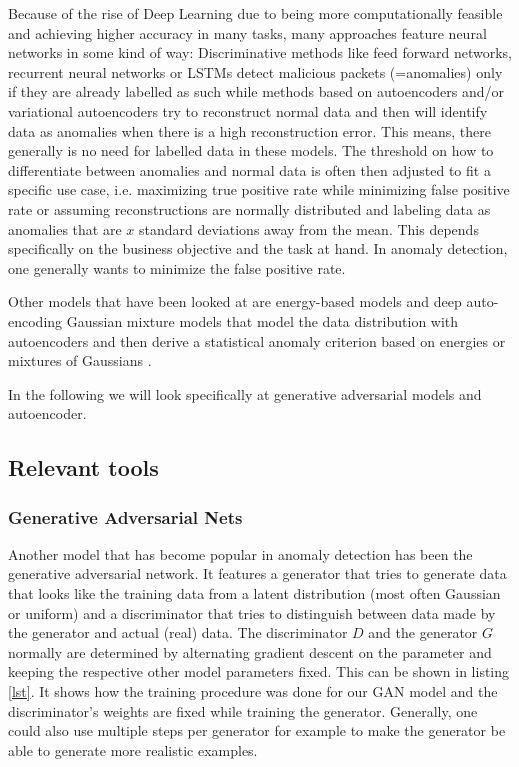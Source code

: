 \documentclass[]{article}
\begin{document}
	 \noindent
	 Because of the rise of Deep Learning due to being more computationally feasible and achieving higher accuracy in many tasks, many approaches feature neural networks in some kind of way: Discriminative methods like feed forward networks, recurrent neural networks or LSTMs detect malicious packets (=anomalies) only if they are already labelled as such while methods based on autoencoders and/or variational autoencoders try to reconstruct normal data and then will identify data as anomalies when there is a high reconstruction error. This means, there generally is no need for labelled data in these models. The threshold on how to differentiate between anomalies and normal data is often then adjusted to fit a specific use case, i.e. maximizing true positive rate while minimizing false positive rate or assuming reconstructions are normally distributed and labeling data as anomalies that are $x$ standard deviations away from the mean. This depends specifically on the business objective and the task at hand. In anomaly detection, one generally wants to minimize the false positive rate. 
	 
	 Other models that have been looked at are energy-based models and deep auto-encoding Gaussian mixture models that model the data distribution with autoencoders and then derive a statistical anomaly criterion based on energies or mixtures of Gaussians \cite{https://doi.org/10.48550/arxiv.1812.02288}.
	 
	 In the following we will look specifically at generative adversarial models and autoencoder. 
	
	 
	 \subsection{Relevant tools}
	 \subsubsection{Generative Adversarial Nets}
	 Another model that has become popular in anomaly detection has been the generative adversarial network. It features a generator that tries to generate data that looks like the training data from a latent distribution (most often Gaussian or uniform) and a discriminator that tries to distinguish between data made by the generator and actual (real) data. The discriminator $D$ and the generator $G$ normally are determined by alternating gradient descent on the parameter and keeping the respective other model parameters fixed. This can be shown in listing \ref{lst}. It shows how the training procedure was done for our GAN model and the discriminator's weights are fixed while training the generator. Generally, one could also use multiple steps per generator for example to make the generator be able to generate more realistic examples. 
	 
\end{document}
